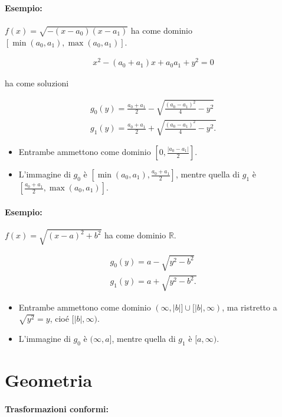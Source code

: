\documentclass{article}
\begin{document}
\paragraph{Esempio:} $f(x) = \sqrt{- (x - a_0)(x - a_1)}$ ha come dominio $[\min(a_0, a_1), \max(a_0, a_1)]$.

\begin{align*}
x^2 - (a_0 + a_1) x + a_0 a_1 + y^2 = 0
\end{align*}

ha come soluzioni

\begin{align*}
g_0(y) = \frac{a_0 + a_1}{2} - \sqrt{\frac{(a_0 - a_1)^2}{4} - y^2}\\
g_1(y) = \frac{a_0 + a_1}{2} + \sqrt{\frac{(a_0 - a_1)^2}{4} - y^2.}
\end{align*}

\begin{itemize}
\item Entrambe ammettono come dominio $\left[0, \frac{|a_0 - a_1|}{2}\right]$.
\item L'immagine di $g_0$ è $\left[\min(a_0, a_1), \frac{a_0 + a_1}{2}\right]$, mentre quella di $g_1$ è $\left[\frac{a_0 + a_1}{2}, \max(a_0, a_1)\right]$.
\end{itemize}

\paragraph{Esempio:} $f(x) = \sqrt{(x - a)^2 + b^2}$ ha come dominio $\mathbb R$.

\begin{align*}
g_0(y) = a - \sqrt{y^2 - b^2}\\
g_1(y) = a + \sqrt{y^2 - b^2.}
\end{align*}

\begin{itemize}
\item Entrambe ammettono come dominio $(\infty, |b|] \cup [|b|, \infty)$, ma ristretto a $\sqrt{y^2} = y$, cioé $[|b|, \infty)$.
\item L'immagine di $g_0$ è $(\infty, a]$, mentre quella di $g_1$ è $[a, \infty)$.
\end{itemize}

\newpage
\section*{Geometria}

\paragraph{Trasformazioni conformi:}
\end{document}
